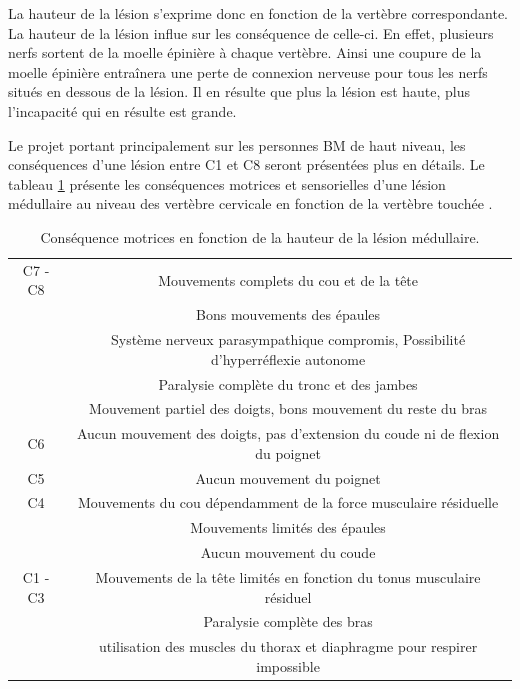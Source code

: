 \documentclass[letterpaper, twoside, 12pt, memoire, creativecommons, hyperref]{thETS}
\begin{document}
La hauteur de la lésion s'exprime donc en fonction de la vertèbre correspondante. La hauteur de la lésion influe sur les conséquence de celle-ci. En effet, plusieurs nerfs sortent de la moelle épinière à chaque vertèbre. Ainsi une coupure de la moelle épinière entraînera une perte de connexion nerveuse pour tous les nerfs situés en dessous de la lésion. Il en résulte que plus la lésion est haute, plus l'incapacité qui en résulte est grande. 

Le projet portant principalement sur les personnes BM de haut niveau, les conséquences d'une lésion entre C1 et C8 seront présentées plus en détails. Le tableau \ref{tab:hauteurlesion} présente les conséquences motrices et sensorielles d'une lésion médullaire au niveau des vertèbre cervicale en fonction de la vertèbre touchée \citep{apparelyzed2008}.

\begin{table}[ht]
	\caption{Conséquence motrices en fonction de la hauteur de la lésion médullaire.}
		\begin{tabular}{|c|c|}
		\hline
	    	 	C7 - C8 & Mouvements complets du cou et de la tête \\
	    	 	& Bons mouvements des épaules\\
	    	 	& Système nerveux parasympathique compromis, Possibilité d'hyperréflexie autonome\\
	    	 	& Paralysie complète du tronc et des jambes\\
	    	 	& Mouvement partiel des doigts, bons mouvement du reste du bras\\
	    \hline
	    	 	C6 & Aucun mouvement des doigts, pas d'extension du coude ni de flexion du poignet\\
	    \hline
	    		C5 & Aucun mouvement du poignet\\
	    	\hline
	    		C4 & Mouvements du cou dépendamment de la force musculaire résiduelle \\
	    		& Mouvements limités des épaules\\
	    		& Aucun mouvement du coude\\
		\hline
			C1 - C3 & Mouvements de la tête limités en fonction du tonus musculaire résiduel\\
			 & Paralysie complète des bras\\
			 & utilisation des muscles du thorax et diaphragme pour respirer impossible\\	    
	    \hline
		\end{tabular}
	\label{tab:hauteurlesion}
\end{table}
\end{document}
